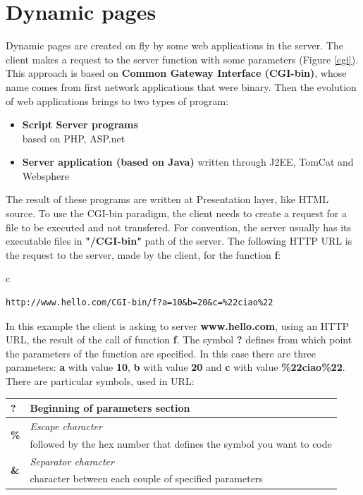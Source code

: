 \section{Dynamic pages}
Dynamic pages are created on fly by some web applications in the server. The client makes a request to the server function with some parameters (Figure \ref{cgi}).\\
This approach is based on \textbf{Common Gateway Interface (CGI-bin)}, whose name comes from first network applications that were binary. Then the evolution of web applications brings to two types of program:
\begin{itemize}
\item{\textbf{Script Server programs}\\
based on PHP, ASP.net}
\item{\textbf{Server application (based on Java)}
written through J2EE, TomCat and Websphere}
\end{itemize}
The result of these programs are written at Presentation layer, like HTML source. To use the CGI-bin paradigm, the client needs to create a request for a file to be executed and not transfered. For convention, the server usually has its executable files in \textbf{"/CGI-bin"} path of the server.
The following HTTP URL is the request to the server, made by the client, for the function \textbf{f}:
\begin{center}
\begin{tabular}{c}
\begin{lstlisting}[linewidth=280pt, basicstyle=\footnotesize\sffamily,]
http://www.hello.com/CGI-bin/f?a=10&b=20&c=%22ciao%22
\end{lstlisting}
\end{tabular}
\end{center}
In this example the client is asking to server \textbf{www.hello.com}, using an HTTP URL, the result of the call of function \textbf{f}. The symbol \textbf{?} defines from which point the parameters of the function are specified. In this case there are three parameters: \textbf{a} with value \textbf{10}, \textbf{b} with value \textbf{20} and \textbf{c} with value \textbf{\%22ciao\%22}.\\ There are particular symbols, used in URL:
\begin{table}[h]
\centering \footnotesize
\begin{tabular}{|l|l|}
\hline
\textbf{?}&{Beginning of parameters section}\\
\hline
\multirow{2}{*}{\textbf{\%}}&{\textit{Escape character}}\\
&{followed by the hex number that defines the symbol you want to code}\\
\hline
\multirow{2}{*}{\textbf{\&}}&{\textit{Separator character}}\\
&{character between each couple of specified parameters}\\
\hline
\end{tabular}
\end{table}
